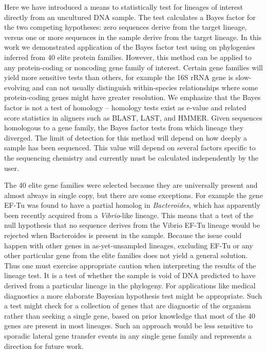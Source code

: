 \documentclass[10pt]{article}
\begin{document}
Here we have introduced a means to statistically test for lineages of interest directly from an uncultured DNA sample.
The test calculates a Bayes factor for the two competing hypotheses: zero sequences derive from the target lineage, versus one or more sequences in the sample derive from the target lineage.
In this work we demonstrated application of the Bayes factor test using on phylogenies inferred from 40 elite protein families.
However, this method can be applied to any protein-coding or noncoding gene family of interest.
Certain gene families will yield more sensitive tests than others, for example the 16S rRNA gene is slow-evolving and can not usually distinguish within-species relationships where some protein-coding genes might have greater resolution.
We emphasize that the Bayes factor is not a test of homology -- homology tests exist as e-value and related score statistics in aligners such as BLAST, LAST, and HMMER.
Given sequences homologous to a gene family, the Bayes factor tests from which lineage they diverged.
The limit of detection for this method will depend on how deeply a sample has been sequenced.
This value will depend on several factors specific to the sequencing chemistry and currently must be calculated independently by the user.

The 40 elite gene families were selected because they are universally present and almost always in single copy, but there are some exceptions.
For example the gene EF-Tu was found to have a partial homolog in \textit{Bacteroides}, which has apparently been recently acquired from a \textit{Vibrio}-like lineage. 
This means that a test of the null hypothesis that no sequence derives from the Vibrio EF-Tu lineage would be rejected when Bacteroides is present in the sample.
Because the issue could happen with other genes in as-yet-unsampled lineages, excluding EF-Tu or any other particular gene from the elite families does not yield a general solution. 
Thus one must exercise appropriate caution when interpreting the results of the lineage test. 
It is a test of whether the sample is void of DNA predicted to have derived from a particular lineage in the phylogeny. 
For applications like medical diagnostics a more elaborate Bayesian hypothesis test might be appropriate. 
Such a test might check for a collection of genes that are diagnostic of the organism rather than seeking a single gene, based on prior knowledge that most of the 40 genes are present in most lineages. 
Such an approach would be less sensitive to sporadic lateral gene transfer events in any single gene family and represents a direction for future work.
\end{document}
